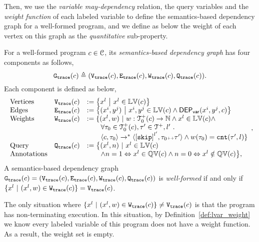 Then, we use the \emph{variable may-dependency} relation, the query variables and the \emph{weight function}
of each labeled variable to 
define the semantics-based dependency graph for a well-formed program,
and we define as below the
weight of each vertex on this graph as the \emph{quantitative} sub-property.
\begin{defn}
\label{def:trace_graph}
For a well-formed program ${c} \in \mathcal{C}$,
its \emph{semantics-based dependency graph} has four components as follows,
\[
 \mathtt{{G_{trace}}}({c}) \triangleq (\mathtt{{V_{trace}}}({c}), \mathtt{{E_{trace}}}({c}), \mathtt{{W_{trace}}}({c}), \mathtt{{Q_{trace}}}({c})).
\]
Each component is defined as below,
{\small
\[
\begin{array}{lll}
 \text{Vertices} &
 \traceV({c}) & := \left\{ 
 x^l
 ~ \middle\vert ~ x^l \in \lvar(c)
 \right\}
 \\
 \text{Edges} &
 \traceE({c}) & := 
 \left\{ 
 (x^i, y^j) 
 ~ \middle\vert ~
 x^i, y^j \in \lvar(c) \land \vardep(x^i, y^j, c) 
 \right\}
 \\
 \text{Weights} &
 \traceW({c}) & := 
 \{ 
 (x^l, w) 
 ~ \vert ~ 
 w : \ftdom_0(c) \to \mathbb{N}
 \land
 x^l \in \lvar(c) \land
 \\ & & \qquad 
 \forall \trace_0 \in \ftdom_0(c), \trace' \in \ftdom, l' \st 
 \\ & & \qquad 
 \config{{c}, \trace_0} \to^{*} 
 \config{\clabel{\eskip}^{l'}, \trace_0 \tracecat \trace'} 
 \land w(\trace_0) = \vcounter(\trace', l) \} 
 \\
 \text{Query} &
 \traceF({c}) & := 
 \big\{(x^l, n) 
 ~ \vert ~ x^l \in \lvar(c) 
 \\ \text{Annotations} & & \qquad
 \land n = 1 \Leftrightarrow x^l \in \qvar(c) \land n = 0 \Leftrightarrow x^l \notin \qvar(c)
 \big\},
\end{array},
\]
}
A semantics-based dependency graph $\mathtt{{G_{trace}}}({c})= (\mathtt{{V_{trace}}}({c}), \mathtt{{E_{trace}}}({c}), \mathtt{{W_{trace}}}({c}), \mathtt{{Q_{trace}}}({c}))$ 
is \emph{well-formed} if and only if $ \{x^l \ |\ (x^l,w)\in \mathtt{{W_{trace}}}({c})\} = \mathtt{{V_{trace}}}({c}) $.
\end{defn}
The only situation where $ \{x^l \ |\ (x^l,w)\in \traceW({c})\} \neq \traceV({c}) $ is that the program
has non-terminating execution.
In this situation, by Definition~\ref{def:lvar_weight}  we know every labeled variable of this program does not have a weight function.
As a result, the weight set is empty.

